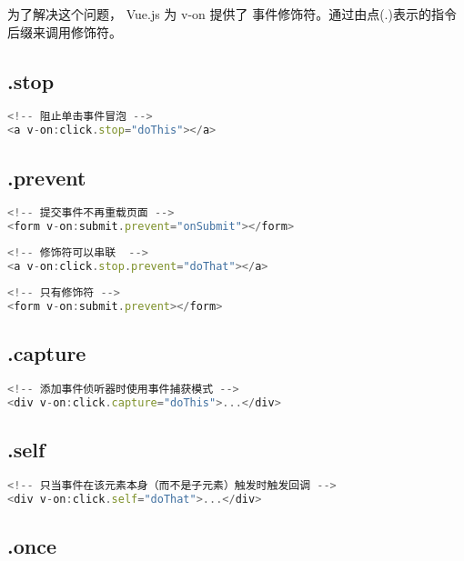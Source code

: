 为了解决这个问题， Vue.js 为 v-on 提供了 事件修饰符。通过由点(.)表示的指令后缀来调用修饰符。

\subsection{.stop}

\begin{lstlisting}[language=JavaScript]
<!-- 阻止单击事件冒泡 -->
<a v-on:click.stop="doThis"></a>
\end{lstlisting}

\subsection{.prevent}

\begin{lstlisting}[language=JavaScript]
<!-- 提交事件不再重载页面 -->
<form v-on:submit.prevent="onSubmit"></form>
\end{lstlisting}


\begin{lstlisting}[language=JavaScript]
<!-- 修饰符可以串联  -->
<a v-on:click.stop.prevent="doThat"></a>
\end{lstlisting}

\begin{lstlisting}[language=JavaScript]
<!-- 只有修饰符 -->
<form v-on:submit.prevent></form>
\end{lstlisting}



\subsection{.capture}


\begin{lstlisting}[language=JavaScript]
<!-- 添加事件侦听器时使用事件捕获模式 -->
<div v-on:click.capture="doThis">...</div>
\end{lstlisting}

\subsection{.self}

\begin{lstlisting}[language=JavaScript]
<!-- 只当事件在该元素本身（而不是子元素）触发时触发回调 -->
<div v-on:click.self="doThat">...</div>
\end{lstlisting}

\subsection{.once}

